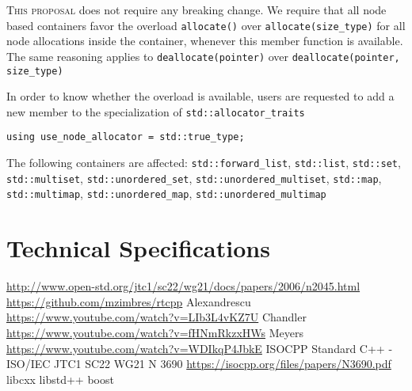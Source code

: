 \documentclass[11pt]{article}
\begin{document}
\textsc{This proposal} does not require any breaking change. We require
that all node based containers favor the overload \texttt{allocate()}
over \texttt{allocate(size\_type)} for all node allocations inside the
container, whenever this member function is available. The same
reasoning applies to \texttt{deallocate(pointer)} over
\texttt{deallocate(pointer, size\_type)}

In order to know whether the overload is available, users are
requested to add a new member to the specialization of
\texttt{std::allocator\_traits}

\begin{lstlisting}
using use_node_allocator = std::true_type;
\end{lstlisting}

The following containers are affected: \texttt{std::forward\_list},
\texttt{std::list}, \texttt{std::set}, \texttt{std::multiset},
\texttt{std::unordered\_set}, \texttt{std::unordered\_multiset},
\texttt{std::map}, \texttt{std::multimap},
\texttt{std::unordered\_map}, \texttt{std::unordered\_multimap}

\section{Technical Specifications}

\begin{thebibliography}{9}

   \url{http://www.open-std.org/jtc1/sc22/wg21/docs/papers/2006/n2045.html}
   \url{https://github.com/mzimbres/rtcpp}
   Alexandrescu \url{https://www.youtube.com/watch?v=LIb3L4vKZ7U}
   Chandler \url{https://www.youtube.com/watch?v=fHNmRkzxHWs}
   Meyers \url{https://www.youtube.com/watch?v=WDIkqP4JbkE}
   ISOCPP Standard C++ - ISO/IEC JTC1 SC22 WG21 N 3690\newline
    \url{https://isocpp.org/files/papers/N3690.pdf}
   libcxx
   libstd++
   boost

\end{thebibliography}
\end{document}

